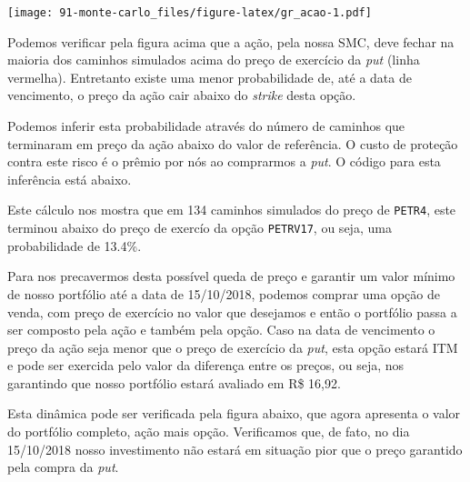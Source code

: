 \documentclass[]{book}
\newenvironment{Shaded}{\begin{snugshade}}{\end{snugshade}}
\newcommand{\KeywordTok}[1]{\textcolor[rgb]{0.13,0.29,0.53}{\textbf{#1}}}
\newcommand{\DataTypeTok}[1]{\textcolor[rgb]{0.13,0.29,0.53}{#1}}
\newcommand{\StringTok}[1]{\textcolor[rgb]{0.31,0.60,0.02}{#1}}
\newcommand{\OperatorTok}[1]{\textcolor[rgb]{0.81,0.36,0.00}{\textbf{#1}}}
\newcommand{\NormalTok}[1]{#1}
\theoremstyle{definition}
\theoremstyle{definition}
\theoremstyle{definition}
\theoremstyle{remark}
\begin{document}
\texttt{[image: 91-monte-carlo\_files/figure-latex/gr\_acao-1.pdf]}

Podemos verificar pela figura acima que a ação, pela nossa SMC, deve
fechar na maioria dos caminhos simulados acima do preço de exercício da
\emph{put} (linha vermelha). Entretanto existe uma menor probabilidade
de, até a data de vencimento, o preço da ação cair abaixo do
\emph{strike} desta opção.

Podemos inferir esta probabilidade através do número de caminhos que
terminaram em preço da ação abaixo do valor de referência. O custo de
proteção contra este risco é o prêmio por nós ao comprarmos a
\emph{put}. O código para esta inferência está abaixo.

\begin{Shaded}
\end{Shaded}

Este cálculo nos mostra que em 134 caminhos simulados do preço de
\texttt{PETR4}, este terminou abaixo do preço de exercío da opção
\texttt{PETRV17}, ou seja, uma probabilidade de 13.4\%.

Para nos precavermos desta possível queda de preço e garantir um valor
mínimo de nosso portfólio até a data de 15/10/2018, podemos comprar uma
opção de venda, com preço de exercício no valor que desejamos e então o
portfólio passa a ser composto pela ação e também pela opção. Caso na
data de vencimento o preço da ação seja menor que o preço de exercício
da \emph{put}, esta opção estará ITM e pode ser exercida pelo valor da
diferença entre os preços, ou seja, nos garantindo que nosso portfólio
estará avaliado em R\$ 16,92.

Esta dinâmica pode ser verificada pela figura abaixo, que agora
apresenta o valor do portfólio completo, ação mais opção. Verificamos
que, de fato, no dia 15/10/2018 nosso investimento não estará em
situação pior que o preço garantido pela compra da \emph{put}.
\end{document}
